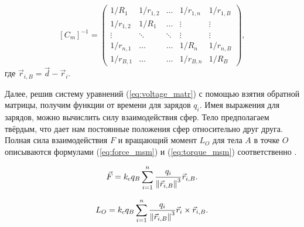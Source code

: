 \begin{equation}
\label{eq:cm_inv}
	[C_m]^{-1} = 
	\begin{pmatrix}
		1/R_1	&	1/r_{1,2}	&	\dots		&	1/r_{1,n}	&	1/r_{1,B} \\
		1/r_{1,2}	&	1/R_1	&	\dots		&	\vdots		&	\vdots \\
		\vdots		&	\ddots		&	\ddots	&	\vdots		&	\vdots \\
		1/r_{n,1}	&	\dots			&	\dots		&	1/R_n	&	1/r_{n,B} \\
		1/r_{B,1}	&	\dots			&	\dots		&	1/r_{B,n}	&	1/R_B
	\end{pmatrix},
\end{equation}
где $\vec{r}_{i,B} = \vec{d} - \vec{r}_i$.

Далее, решив систему уравнений (\ref{eq:voltage_matr}) с помощью взятия обратной матрицы, получим функции от времени для зарядов $q_i$.
Имея выражения для зарядов, можно вычислить силу взаимодействия сфер.
Тело предполагаем твёрдым, что дает нам постоянные положения сфер относительно друг друга.
Полная сила взаимодействия $F$ и вращающий момент $L_O$ для тела $A$ в точке $O$ описываются формулами (\ref{eq:force_msm}) и (\ref{eq:torque_msm}) соответственно \cite{msm}.

\begin{equation}
\label{eq:force_msm}
	\vec{F} = k_c q_B \sum_{i=1}^n \frac{q_i}{\left\lVert\vec{r}_{i,B}\right\rVert^3}\vec{r}_{i,B}.
\end{equation}

\begin{equation}
\label{eq:torque_msm}
	L_O = k_c q_B \sum_{i=1}^n \frac{q_i}{\left\lVert\vec{r}_{i,B}\right\rVert^3} \vec{r}_i \times \vec{r}_{i,B}.
\end{equation}